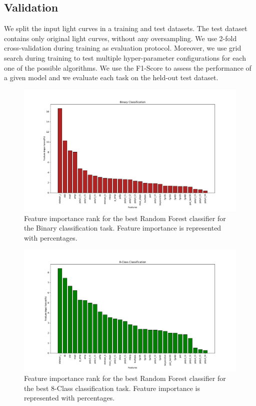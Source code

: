 \documentclass[a4paper,fleqn,usenatbib]{mnras}
\begin{document}
\subsection{Validation} \label{subsection_importances}

We split the input light curves in a training and test datasets. 
The test dataset contains only original light curves, without any
oversampling. 
We use 2-fold cross-validation during training as evaluation
protocol. 
Moreover, we use grid search during training to test multiple
hyper-parameter configurations for each one  of the possible
algorithms. 
We use the F1-Score to assess the performance of a given model and 
we evaluate each task on the held-out test dataset.

\begin{figure}
	\includegraphics[width=\textwidth]{binFeatImportance.pdf}
    \caption{Feature importance rank  for the best Random Forest
      classifier for the Binary classification task. 
      Feature importance is represented with percentages.} 
    \label{Importances-Binary}
\end{figure} 

\begin{figure}
	\includegraphics[width=\textwidth]{8classFeatImportance.pdf}
    \caption{Feature importance rank for the best Random Forest
      classifier for the best 8-Class classification task. Feature
      importance is represented with percentages.} 
    \label{Importances-8-Class}
\end{figure}
\end{document}
